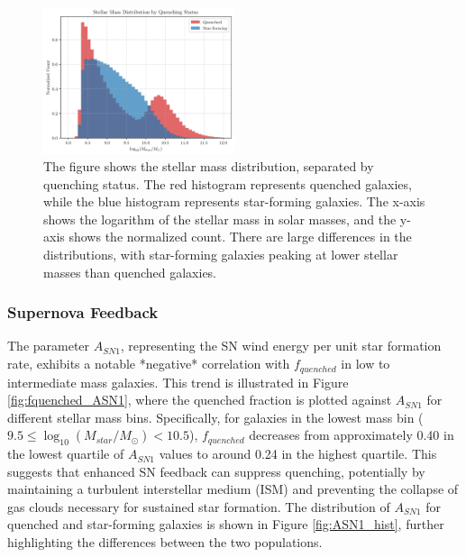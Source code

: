 \documentclass[twocolumn]{aastex631}
\begin{document}
\begin{figure}[h!]
    \centering
    \includegraphics[width=0.5\textwidth]{../Project6/plots/Mstar_histogram_2_20250424_133143.png}
    \caption{\label{fig:Mstar_hist} The figure shows the stellar mass distribution, separated by quenching status. The red histogram represents quenched galaxies, while the blue histogram represents star-forming galaxies. The x-axis shows the logarithm of the stellar mass in solar masses, and the y-axis shows the normalized count. There are large differences in the distributions, with star-forming galaxies peaking at lower stellar masses than quenched galaxies.
}
\end{figure}

\subsubsection{Supernova Feedback}

The parameter \(A_{SN1}\), representing the SN wind energy per unit star formation rate, exhibits a notable *negative* correlation with \(f_{quenched}\) in low to intermediate mass galaxies. This trend is illustrated in Figure \ref{fig:fquenched_ASN1}, where the quenched fraction is plotted against \(A_{SN1}\) for different stellar mass bins. Specifically, for galaxies in the lowest mass bin (\(9.5 \leq \log_{10}(M_{star}/M_\odot) < 10.5\)), \(f_{quenched}\) decreases from approximately 0.40 in the lowest quartile of \(A_{SN1}\) values to around 0.24 in the highest quartile. This suggests that enhanced SN feedback can suppress quenching, potentially by maintaining a turbulent interstellar medium (ISM) and preventing the collapse of gas clouds necessary for sustained star formation. The distribution of $A_{SN1}$ for quenched and star-forming galaxies is shown in Figure \ref{fig:ASN1_hist}, further highlighting the differences between the two populations.
\end{document}
